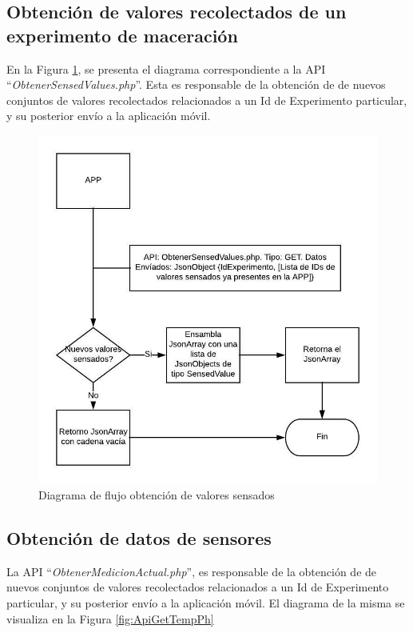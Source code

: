         \subsection{Obtención de valores recolectados de un experimento de maceración}
        \par En la Figura \ref{fig:ApiGet}, se presenta el diagrama correspondiente a la API ``\textit{ObtenerSensedValues.php}''. Esta es responsable de la obtención de de nuevos conjuntos de valores recolectados relacionados a un Id de Experimento particular, y su posterior envío a la aplicación móvil.
            \begin{figure} [htb]
                \centering
                \includegraphics{DiagramaAPIGet.jpeg}
                \caption{Diagrama de flujo obtención de valores sensados}
                \label{fig:ApiGet}
            \end{figure}
        
        \subsection{Obtención de datos de sensores}
        \par La API ``\textit{ObtenerMedicionActual.php}'', es responsable de la obtención de de nuevos conjuntos de valores recolectados relacionados a un Id de Experimento particular, y su posterior envío a la aplicación móvil. El diagrama de la misma se visualiza en la Figura \ref{fig:ApiGetTempPh}
        
